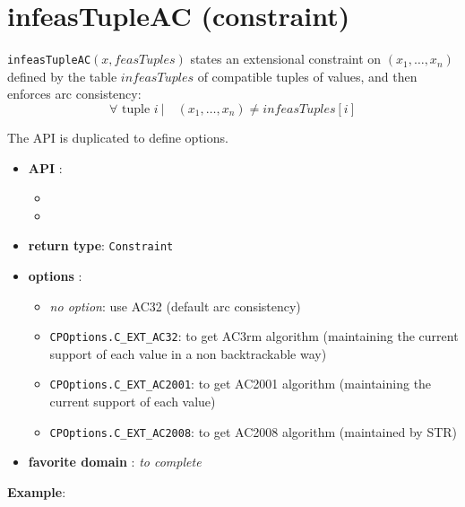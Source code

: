 \label{infeastupleac}
\hypertarget{infeastupleac}{}

\section{infeasTupleAC (constraint)}\label{infeastupleac:infeastupleacconstraint}\hypertarget{infeastupleac:infeastupleacconstraint}{}
\begin{notedef}
  \texttt{infeasTupleAC}$(x,feasTuples)$ states an extensional constraint on $(x_1,\ldots,x_n)$ defined by the table $infeasTuples$ of compatible tuples of values, and then enforces arc consistency:
      $$\forall \text{ tuple } i\ |\quad (x_1,\ldots,x_n)\neq infeasTuples[i]$$
\end{notedef}

The API is duplicated to define options.
\begin{itemize}
	\item \textbf{API} :
	\begin{itemize}
		\item {}
		\item {}
	\end{itemize}
	\item \textbf{return type}: \texttt{Constraint}
	\item \textbf{options} :
	\begin{itemize}
		\item \emph{no option}: use AC32 (default arc consistency)
		\item \texttt{CPOptions.C_EXT_AC32}: to get AC3rm algorithm (maintaining the current support of each value in a non backtrackable way)
		\item \texttt{CPOptions.C_EXT_AC2001}: to get AC2001 algorithm (maintaining the current support of each value)
		\item \texttt{CPOptions.C_EXT_AC2008}: to get AC2008 algorithm (maintained by STR)
	\end{itemize}
	\item \textbf{favorite domain} : \emph{to complete}
\end{itemize}

\textbf{Example}:


